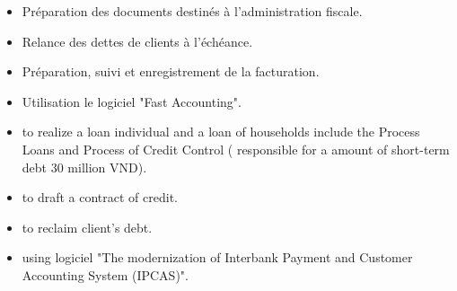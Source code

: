 \documentclass[12pt,a4paper]{altacv}
\begin{document}

\begin{fullwidth}
\makecvheader
\end{fullwidth}



\begin{itemize}
\item Préparation des documents destinés à l’administration fiscale.
\item Relance des dettes de clients à l'échéance.
\item Préparation, suivi et enregistrement de la facturation. 
\item Utilisation le logiciel "Fast Accounting".
\end{itemize}

\divider

\begin{itemize}
\item to realize a loan individual and a loan of households include the Process Loans and Process of Credit Control ( responsible for a amount of short-term debt 30 million VND).  
\item to draft a contract of credit.
\item to reclaim client's debt.
\item using logiciel  "The modernization of Interbank Payment and Customer Accounting System (IPCAS)".
\end{itemize}
\end{document}
